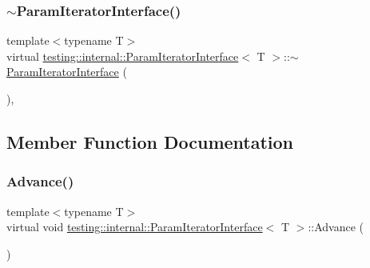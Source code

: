 \subsubsection{\texorpdfstring{$\sim$ParamIteratorInterface()}{~ParamIteratorInterface()}}
{\footnotesize\ttfamily template$<$typename T$>$ \\
virtual \mbox{\hyperlink{classtesting_1_1internal_1_1ParamIteratorInterface}{testing\+::internal\+::\+Param\+Iterator\+Interface}}$<$ T $>$\+::$\sim$\mbox{\hyperlink{classtesting_1_1internal_1_1ParamIteratorInterface}{Param\+Iterator\+Interface}} (\begin{DoxyParamCaption}{ }\end{DoxyParamCaption})\hspace{0.3cm}{\ttfamily [inline]}, {\ttfamily [virtual]}}



\subsection{Member Function Documentation}
\mbox{\label{classtesting_1_1internal_1_1ParamIteratorInterface_a600dbd35fcb551463e379516a1abea48}} 
\subsubsection{\texorpdfstring{Advance()}{Advance()}}
{\footnotesize\ttfamily template$<$typename T$>$ \\
virtual void \mbox{\hyperlink{classtesting_1_1internal_1_1ParamIteratorInterface}{testing\+::internal\+::\+Param\+Iterator\+Interface}}$<$ T $>$\+::Advance (\begin{DoxyParamCaption}{ }\end{DoxyParamCaption})\hspace{0.3cm}{\ttfamily [pure virtual]}}

\mbox{\label{classtesting_1_1internal_1_1ParamIteratorInterface_a17500953df75ecda1ace46c08ff731e9}} 
